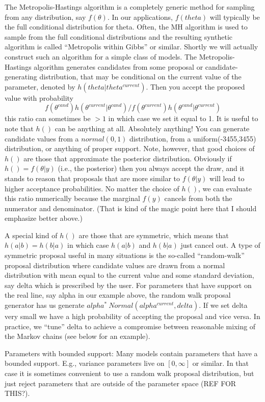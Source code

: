 The Metropolis-Hastings algorithm is a completely generic method for
sampling from any distribution, say $f(\theta)$. In our applications,
$f(theta)$ will typically be the full conditional distribution for
theta. Often, the MH algorithm is used to sample from the full
conditional distributions and the resulting synthetic algorithm is
called ``Metropolis within Gibbs'' or similar. Shortly we will
actually construct such an algorithm for a simple class of models.
The Metropolis-Hastings algorithm generates candidates from some
proposal or candidate-generating distribution, that may be conditional
on the current value of the parameter, denoted by
$h(theta|theta^{current})$. Then you accept the proposed value with
probability
\[
f(\theta^{cand}) h(\theta^{current}|\theta^{cand})/
f(\theta^{current}) h(\theta^{cand}|\theta^{current})
\]
this ratio can sometimes be $>1$ in which case we set it equal to
1. It is useful to note that $h()$ can be anything at all. Absolutely anything!  You can generate candidate values from a $normal(0,1)$ distribution, from a uniform(-3455,3455) distribution, or anything of proper support.  Note, however, that good choices of $h()$ are those that approximate the posterior distribution. Obviously if $h() = f(\theta|y)$ (i.e., the posterior) then you always accept the draw, and it stands to reason that proposals that are more similar to $f(\theta|y)$ will lead to higher acceptance probabilities. No matter the choice of $h()$,  we can evaluate this ratio numerically because the marginal $f(y)$ cancels from both the numerator and denominator. (That is kind of the magic point here that I should emphasize better above.) 

A special kind of $h()$ are those that are symmetric, which means that $h(a|b) = h(b|a)$ in which case $h(a|b)$ and $h(b|a)$ just cancel out. A type of symmetric proposal useful in many situations is the so-called ``random-walk'' proposal distribution where candidate values are drawn from a normal distribution with mean equal to the current value and some standard deviation, say delta which is prescribed by the user. For parameters that have support on the real line, say alpha in our example above, the random walk proposal generator has us generate $alpha^{*} ~ Normal(alpha^{current},delta)$.  If we set delta very small we have a high probability of accepting the proposal and vice versa.  In practice, we ``tune'' delta to achieve a compromise between reasonable mixing of the Markov chains (see below for an example).

Parameters with bounded support: Many models contain parameters that have a bounded support. E.g., variance parameters live on $[0,\infty]$ or similar. In that case it is sometimes convenient to use a random walk proposal distribution, but just reject parameters that are outside of the parameter space (REF FOR THIS?). 



